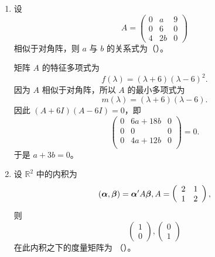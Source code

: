 \begin{enumerate}[1~]
\begin{enumerate}[1.~]
\item
设 
$$
A = \left( \begin{matrix} { 0 } & { a } & { 9 } \\ { 0 } & { 6 } & { 0 } \\ { 4 } & { 2 b } & { 0 } \end{matrix} \right)
$$
相似于对角阵，则 $a$ 与 $b$ 的关系式为（\quad）。

\begin{solution}
矩阵 $A$ 的特征多项式为\[
f(\lambda) = (\lambda + 6) (\lambda - 6)^2.
\]
因为 $A$ 相似于对角阵，所以 $A$ 的最小多项式为 \[
m(\lambda) = (\lambda + 6) (\lambda - 6).
\]
因此 $(A + 6 I) (A - 6 I) = 0$，即\[
\left( \begin{matrix}
	0&		6a+18b&		0\\
	0&		0&		0\\
	0&		4a+12b&		0\\
\end{matrix} \right) =0.
\]
于是 $a + 3b = 0$。
\end{solution}

\item
设 $\mathbb{R}^2$ 中的内积为 
$$
(\boldsymbol{\alpha} , \boldsymbol{\beta} ) = \boldsymbol{\alpha} ^ { \prime } A \boldsymbol{\beta} , A = \left( \begin{array} { l l } { 2 } & { 1 } \\ { 1 } & { 2 } \end{array} \right),
$$
则
$$
\left(\begin{array} { l } { 1 } \\ { 0 } \end{array} \right) , \left( \begin{array} { l } { 0 } \\ { 1 } \end{array} \right)
$$
在此内积之下的度量矩阵为 （\quad）。 


\end{enumerate}
\end{enumerate}
